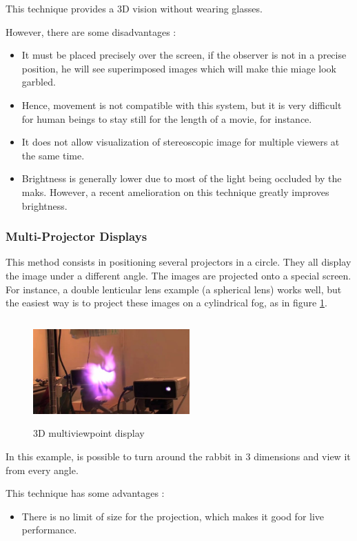 This technique provides a 3D vision without wearing glasses.

However, there are some disadvantages :
\begin{itemize}
\item It must be placed precisely over the screen, if the observer is not in a precise position, he will see superimposed images which will make thie miage look garbled.
\item Hence, movement is not compatible with this system, but it is very difficult for human beings to stay still for the length of a movie, for instance.
\item It does not allow visualization of stereoscopic image for multiple viewers at the same time.
\item Brightness is generally lower due to most of the light being occluded by the maks. However, a recent amelioration on this technique greatly improves brightness\cite{lv2014shared}.
\end{itemize}

\subsubsection{Multi-Projector Displays}
This method consists in positioning several projectors in a circle. They all display the image under a different angle. The images are projected onto a special screen. For instance, a double lenticular lens example (a spherical lens) works well, but the easiest way is to project these images on a cylindrical fog, as in figure \ref{fig:cilfog}.

\begin{figure}[h!]
\centering\includegraphics[width=6cm,height=4cm]{image/lapin.png}
\caption{3D multiviewpoint display\cite{3Dmultiviewpoint}}
\label{fig:cilfog}
\end{figure}

In this example, is possible to turn around the rabbit in 3 dimensions and view it from every angle.

This technique has some advantages : 
\begin{itemize}
\item There is no limit of size for the projection, which makes it good for live performance.
\end{itemize}

